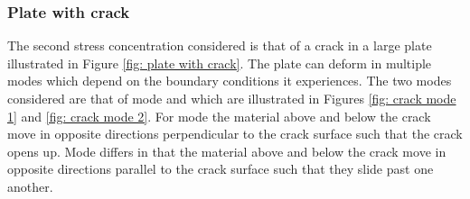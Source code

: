 \documentclass[12pt,oneside,openany,a4paper, %
english, %
masters-t, goldenblock]{usthesis}
\newcommand{\RomanNumeralCaps}[1]
    {\MakeUppercase{\romannumeral #1}}
\begin{document}
\subsubsection{Plate with crack}
The second stress concentration considered is that of a crack in a large plate illustrated in Figure \ref{fig: plate with crack}. The plate can deform in multiple modes which depend on the boundary conditions it experiences. The two modes considered are that of mode \RomanNumeralCaps{1} and \RomanNumeralCaps{2} which are illustrated in Figures \ref{fig: crack mode 1} and \ref{fig: crack mode 2}. For mode \RomanNumeralCaps{1} the material above and below the crack move in opposite directions perpendicular to the crack surface such that the crack opens up. Mode \RomanNumeralCaps{2} differs in that the material above and below the crack move in opposite directions parallel to the crack surface such that they slide past one another. 


\end{document}
